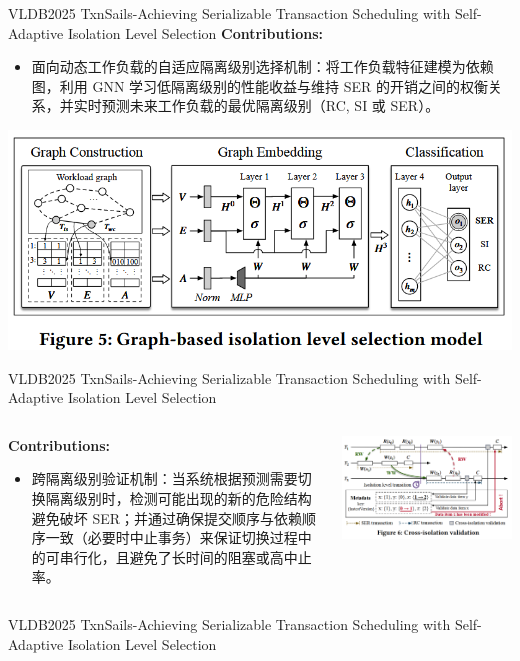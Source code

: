 \begin{frame}{VLDB2025 TxnSails-Achieving Serializable Transaction Scheduling with Self-Adaptive Isolation Level Selection}
	\textbf{Contributions: }
	\begin{itemize}
		\item 面向动态工作负载的自适应隔离级别选择机制：将工作负载特征建模为依赖图，利用 GNN 学习低隔离级别的性能收益与维持 SER 的开销之间的权衡关系，并实时预测未来工作负载的最优隔离级别（RC, SI 或 SER）。
	\end{itemize}
	\includegraphics[width=0.8\linewidth]{figs/TxnSails-selection-model}
\end{frame}

\begin{frame}{VLDB2025 TxnSails-Achieving Serializable Transaction Scheduling with Self-Adaptive Isolation Level Selection}
	\begin{columns}
		\begin{column}{0.5\textwidth}
			\textbf{Contributions: }
			\begin{itemize}
				\item 跨隔离级别验证机制：当系统根据预测需要切换隔离级别时，检测可能出现的新的危险结构避免破坏 SER；并通过确保提交顺序与依赖顺序一致（必要时中止事务）来保证切换过程中的可串行化，且避免了长时间的阻塞或高中止率。
			\end{itemize}
		\end{column}
		\begin{column}{0.5\textwidth}
			\includegraphics[width=0.98\linewidth]{figs/TxnSails-cross-isolation}
		\end{column}
	\end{columns}
\end{frame}

\begin{frame}{VLDB2025 TxnSails-Achieving Serializable Transaction Scheduling with Self-Adaptive Isolation Level Selection}
\end{frame}
